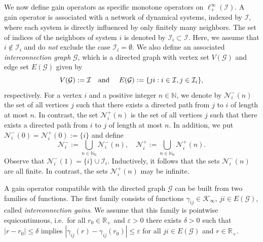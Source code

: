 \documentclass[10pt, oneside, a4paper]{article}
\newcommand{\N}{\mathbb{N}}
\newcommand{\R}{\mathbb{R}}
\newcommand{\ep}{\varepsilon}
\newcommand{\GC}{\mathcal{G}}
\newcommand{\IC}{\mathcal{I}}
\newcommand{\KC}{\mathcal{K}}
\newcommand{\NC}{\mathcal{N}}
\begin{document}
We now define gain operators as specific monotone operators on $\ell^{\infty}_+(\IC)$. A gain operator is associated with a network of dynamical systems, indexed by $\IC$, where each system is directly influenced by only finitely many neighbors. The set of indices of the neighbors of system $i$ is denoted by $\IC_i \subset \IC$. Here, we assume that $i \notin \IC_i$ and do \emph{not} exclude the case $\IC_i = \emptyset$. We also define an associated \emph{interconnection graph} $\GC$, which is a directed graph with vertex set $V(\GC)$ and edge set $E(\GC)$ given by%
\begin{equation*}
  V(\GC) := \IC \mbox{\quad and \quad} E(\GC) := \{ ji : i \in \IC, j \in \IC_i \},%
\end{equation*}
respectively. For a vertex $i$ and a positive integer $n \in \N$, we denote by $\NC^-_i(n)$ the set of all vertices $j$ such that there exists a directed path from $j$ to $i$ of length at most $n$. In contrast, the set $\NC^+_i(n)$ is the set of all vertices $j$ such that there exists a directed path from $i$ to $j$ of length at most $n$. In addition, we put $\NC^-_i(0) = \NC^+_i(0) := \{i\}$ and define%
\begin{equation*}
  \NC^-_i := \bigcup_{n \in \N_0}\NC^-_i(n),\quad \NC^+_i := \bigcup_{n \in \N_0}\NC^+_i(n).%
\end{equation*}
Observe that $\NC^-_i(1) = \{i\} \cup \IC_i$. Inductively, it follows that the sets $\NC^-_i(n)$ are all finite. In contrast, the sets $\NC^+_i(n)$ may be infinite.%

A gain operator compatible with the directed graph $\GC$ can be built from two families of functions. The first family consists of functions $\gamma_{ij} \in \KC_{\infty}$, $ji \in E(\GC)$, called \emph{interconnection gains}. We assume that this family is pointwise equicontinuous, i.e.~for all $r_0 \in \R_+$ and $\ep > 0$ there exists $\delta > 0$ such that $|r - r_0| \leq \delta$ implies $|\gamma_{ij}(r) - \gamma_{ij}(r_0)| \leq \ep$ for all $ji \in E(\GC)$ and $r \in \R_+$.%
\end{document}
